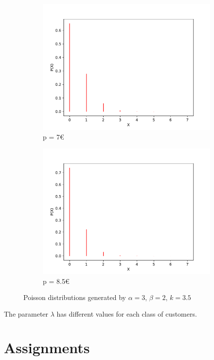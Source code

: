 \documentclass[12pt,a4paper]{report}
\begin{document}
\begin{figure}[H]
\begin{subfigure}{.49\textwidth}
  \includegraphics[width=1\linewidth]{7e}
  \caption{p = 7\euro}
  \label{fig:sub3}
\end{subfigure}
\begin{subfigure}{.49\textwidth}
  \centering
  \includegraphics[width=1\linewidth]{85e}
  \caption{p = 8.5\euro}
  \label{fig:sub4}
\end{subfigure}
	\caption{Poisson distributions generated by $\alpha=3$, $\beta=2$, $k=3.5$}
\end{figure}

\noindent The parameter $\lambda$ has different values for each class of customers. 


	\chapter{Assignments}
\end{document}
